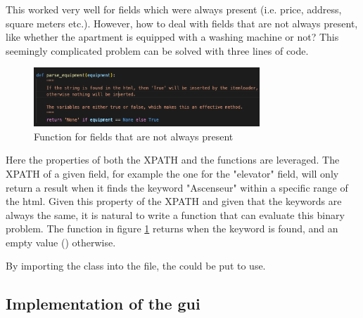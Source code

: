 \documentclass[main]{subfiles}
\begin{document}
This worked very well for fields which were always present (i.e. price, address, square meters etc.).
However, how to deal with fields that are not always present, 
like whether the apartment is equipped with a washing machine or not?
This seemingly complicated problem can be solved with three lines of code.

\begin{figure}[htbp]
    \centerline{
        \includegraphics[width = 85mm]{prog_6.png}}
    \caption{Function for fields that are not always present}
    \label{fig:ispresentornot}
\end{figure}

Here the properties of both the XPATH and the functions are leveraged.
The XPATH of a given field, for example the one for the "elevator" field, 
will only return a result when it finds the keyword "Ascenseur" within a specific range of the \acs*{html}.
Given this property of the XPATH and given that the keywords are always the same, 
it is natural to write a function that can evaluate this binary problem.
The function in figure \ref{fig:ispresentornot} returns \pkg[True] when the keyword is found,
and an empty value (\pkg[N/A]) otherwise.

By importing the class \pkg[ComparisWebscraperItem] into the  file, the \pkg[ItemLoader] 
could be put to use.

\subsection{Implementation of the \ac{gui}}
\end{document}
